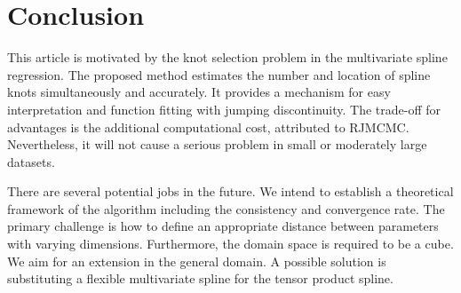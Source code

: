 \section{Conclusion}

This article is motivated by the knot selection problem in the multivariate spline regression. %
The proposed method estimates the number and location of spline knots simultaneously and accurately. %
It provides a mechanism for easy interpretation and function fitting with jumping discontinuity. The trade-off for advantages is the additional computational cost, attributed to RJMCMC. Nevertheless, it will not cause a serious problem in small or moderately large datasets.

There are several potential jobs in the future. We intend to establish a theoretical framework of the algorithm including the consistency and convergence rate. The primary challenge is how to define an appropriate distance between parameters with varying dimensions. Furthermore, the domain space is required to be a cube. We aim for an extension in the general domain. A possible solution is substituting a flexible multivariate spline for the tensor product spline.